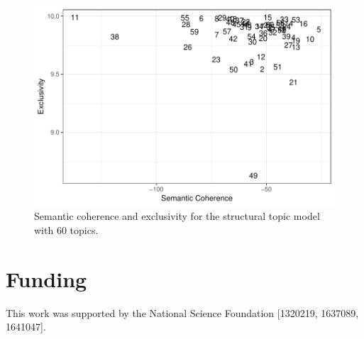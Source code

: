 \documentclass[11pt]{article}
\begin{document}
\begin{figure}
	\centering
	\includegraphics{figures/stm_60_coherence_exclusivity.pdf}
	\caption{Semantic coherence and exclusivity for the structural topic model with 60 topics.}
	\label{fig:coherence_exclusivity}
\end{figure}



\section*{Funding}
This work was supported by the National Science Foundation [1320219, 1637089, 1641047].

%
%

%




\end{document}
